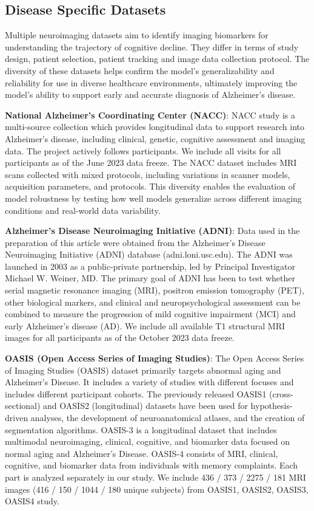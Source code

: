 \documentclass[pdflatex,sn-nature]{sn-jnl}%
\theoremstyle{thmstyleone}%
\theoremstyle{thmstyletwo}%
\theoremstyle{thmstylethree}%
\begin{document}
\begin{appendices}
\subsection{Disease Specific Datasets
}

Multiple neuroimaging datasets aim to identify imaging biomarkers for understanding the trajectory of cognitive decline. They differ in terms of study design, patient selection, patient tracking and image data collection protocol. The diversity of these datasets helps confirm the model's generalizability and reliability for use in diverse healthcare environments, ultimately improving the model’s ability to support early and accurate diagnosis of Alzheimer’s disease.


\textbf{National Alzheimer's Coordinating Center (NACC)}\citep{beekly2007national}: NACC study is a multi-source collection which provides longitudinal data to support research into Alzheimer’s disease, including clinical, genetic, cognitive assessment and imaging data. The project actively follows participants. We include all visits for all participants as of the June 2023 data freeze. The NACC dataset includes MRI scans collected with mixed protocols, including variations in scanner models, acquisition parameters, and protocols. This diversity enables the evaluation of model robustness by testing how well models generalize across different imaging conditions and real-world data variability. 

\textbf{Alzheimer's Disease Neuroimaging Initiative (ADNI)}\citep{petersen2010alzheimer}: Data used in the preparation of this article were obtained from the Alzheimer’s Disease Neuroimaging Initiative (ADNI) database (adni.loni.usc.edu). The ADNI was launched in 2003 as a public-private partnership, led by Principal Investigator Michael W. Weiner, MD. The primary goal of ADNI has been to test whether serial magnetic resonance imaging (MRI), positron emission tomography (PET), other biological markers, and clinical and neuropsychological assessment can be combined to measure the progression of mild cognitive impairment (MCI) and early Alzheimer’s disease (AD).  
We include all available T1 structural MRI images for all participants as of the October 2023 data freeze.

\textbf{OASIS (Open Access Series of Imaging Studies)}\citep{lamontagne2019oasis,marcus2010open, marcus2007open}: The Open Access Series of Imaging Studies (OASIS) dataset primarily targets abnormal aging and Alzheimer’s Disease. It includes a variety of studies with different focuses and includes different participant cohorts. The previously released OASIS1 (cross-sectional) and OASIS2 (longitudinal) datasets have been used for hypothesis-driven analyses, the development of neuroanatomical atlases, and the creation of segmentation algorithms. OASIS-3 is a longitudinal dataset that includes multimodal neuroimaging, clinical, cognitive, and biomarker data focused on normal aging and Alzheimer’s Disease. OASIS-4 consists of MRI, clinical, cognitive, and biomarker data from individuals with memory complaints. Each part is analyzed separately in our study. We include 436 / 373 / 2275 / 181 MRI images (416 / 150 / 1044 / 180 unique subjects) from OASIS1, OASIS2, OASIS3, OASIS4 study.


\end{appendices}
\end{document}
